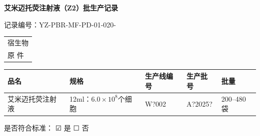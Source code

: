 \documentclass[UTF8,10pt,a4paper,fontset=fandol]{ctexart}
\newcommand{\fieldvalue}[1]{#1}
\newcommand{\handwritten}[1]{#1}
\newcommand{\checkboxfield}[1]{\ifstrequal{#1}{checked}{☑}{\ifstrequal{#1}{unclear}{?}{☐}}}
\begin{document}

\newpage

\begin{center}
\textbf{艾米迈托荧注射液（Z2）批生产记录}
\end{center}

\noindent
记录编号：YZ-PBR-MF-PD-01-020- \hfill
\begin{tabular}{|p{2.8cm}|}
\hline
宿生物\\
原 件\\
\hline
\end{tabular}

\vspace{0.5em}

\noindent
\begin{tabular}{|p{3.1cm}|p{2.8cm}|p{2.8cm}|p{3.0cm}|p{2.1cm}|}
\hline
\centering\textbf{品名} &
\centering\textbf{规格} &
\centering\textbf{生产线编号} &
\centering\textbf{生产批号} &
\centering\textbf{批量}\\
\hline
艾米迈托荧注射液 &
12ml：$6.0\times10^{8}$个细胞 &
\fieldvalue{\handwritten{W?002}} &
\fieldvalue{\handwritten{A?2025?}} &
200--480袋\\
\hline
\end{tabular}

\vspace{0.5em}

\noindent
是否符合标准：
\fieldvalue{\handwritten{\checkboxfield{checked}}} 是
\qquad
\fieldvalue{\checkboxfield{unchecked}} 否

\vspace{0.3em}
\end{document}
